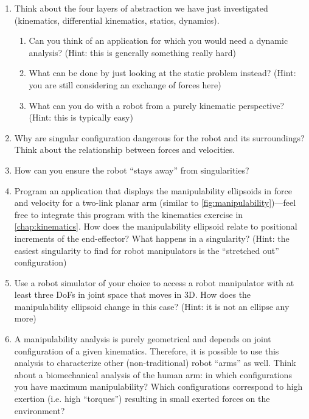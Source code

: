 \begin{enumerate}
\item Think about the four layers of abstraction we have just investigated (kinematics, differential kinematics, statics, dynamics).
\begin{enumerate}
\item Can you think of an application for which you would need a dynamic analysis? (Hint: this is generally something really hard)
\item What can be done by just looking at the static problem instead? (Hint: you are still considering an exchange of forces here)
\item What can you do with a robot from a purely kinematic perspective? (Hint: this is typically easy)
\end{enumerate}
\item Why are singular configuration dangerous for the robot and its surroundings? Think about the relationship between forces and velocities.
\item How can you ensure the robot ``stays away'' from singularities?
\item Program an application that displays the manipulability ellipsoids in force and velocity for a two-link planar arm (similar to \cref{fig:manipulability})---feel free to integrate this program with the kinematics exercise in \cref{chap:kinematics}. How does the manipulability ellipsoid relate to positional increments of the end-effector? What happens in a singularity? (Hint: the easiest singularity to find for robot manipulators is the ``stretched out'' configuration)
\item Use a robot simulator of your choice to access a robot manipulator with at least three DoFs in joint space that moves in 3D. How does the manipulability ellipsoid change in this case? (Hint: it is not an ellipse any more)
\item A manipulability analysis is purely geometrical and depends on joint configuration of a given kinematics. Therefore, it is possible to use this analysis to characterize other (non-traditional) robot ``arms'' as well. Think about a biomechanical analysis of the human arm: in which configurations you have maximum manipulability? Which configurations correspond to high exertion (i.e. high ``torques'') resulting in small exerted forces on the environment?
\end{enumerate}\normalsize
